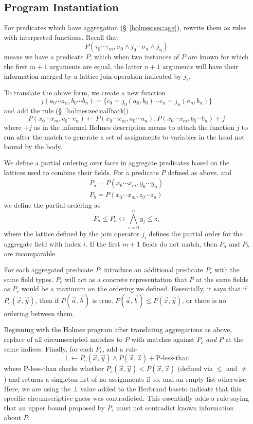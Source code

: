 \subsection{Program Instantiation}
For predicates which have aggregation (\S~\ref{holmes:sec:agg}), rewrite them as rules with interpreted functions.
Recall that
\[
	P(\tau_0 \cdots \tau_m, \sigma_0\wedge j_0 \cdots \sigma_n \wedge j_n)
\]
means we have a predicate $P$, which when two instances of $P$ are known for which the first $m + 1$ arguments are equal, the latter $n + 1$ arguments will have their information merged by a lattice join operation indicated by $j_i$.

To translate the above form, we create a new function
\[
	j(a_0 \cdots a_n, b_0 \cdots b_n) = \{c_0 = j_0(a_0, b_0) \cdots c_n = j_n(a_n, b_n)\}
\]
and add the rule (\S~\ref{holmes:sec:callback})
\[
	P(x_0 \cdots x_m, c_0 \cdots c_n) \leftarrow P(x_0 \cdots x_m, a_0 \cdots a_n), P(x_0 \cdots x_m, b_0 \cdots b_n) + j
\]
where $+ j$ as in the informal Holmes description means to attach the function $j$ to run after the match to generate a set of assignments to variables in the head not bound by the body.

We define a partial ordering over facts in aggregate predicates based on the lattices used to combine their fields.
For a predicate $P$ defined as above, and
\begin{align}
	P_a = P(x_0 \cdots x_m, y_0 \cdots y_n)\\
	P_b = P(x_0 \cdots x_m, z_0 \cdots z_n)
\end{align}
we define the partial ordering as
\[
	P_a \leq P_b \leftrightarrow \bigwedge_{i = 0}^n y_i \leq z_i
\]
where the lattice defined by the join operator $j_i$ defines the partial order for the  aggregate field with index $i$.
If the first $m + 1$ fields do not match, then $P_a$ and $P_b$ are incomparable.

For each aggregated predicate $P$, introduce an additional predicate $P_c$ with the same field types.
$P_c$ will act as a concrete representation that $P$ at the same fields as $P_c$ would be a maximum on the ordering we defined.
Essentially, it says that if $P_c(\vec{x}, \vec{y})$, then if $P(\vec{a}, \vec{b})$ is true, $P(\vec{a}, \vec{b}) \leq P(\vec{x}, \vec{y})$, or there is no ordering between them.

Beginning with the Holmes program after translating aggregations as above, replace of all circumscripted matches to $P$ with matches against $P_c$ \emph{and} $P$ at the same indices.
Finally, for each $P_c$, add a rule
\[
	\bot \leftarrow P_c(\vec{x}, \vec{y}) \wedge P(\vec{x}, \vec{z}) + \textrm{P-less-than}
\]
where P-less-than checks whether $P_c(\vec{x}, \vec{y}) < P(\vec{x}, \vec{z})$ (defined via $\leq$ and $\neq$) and returns a singleton list of no assignments if so, and an empty list otherwise.
Here, we are using the $\bot$ value added to the Herbrand baseto indicate that this specific circumscriptive guess was contradicted.
This essentially adds a rule saying that an upper bound proposed by $P_c$ must not contradict known information about $P$.

